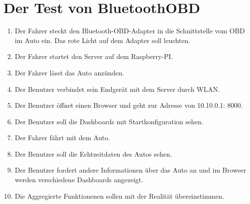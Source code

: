 \documentclass[qualitaetssicherung.tex]{subfiles}
\begin{document}
\section{Der Test von BluetoothOBD}
\begin{enumerate}
  \item Der Fahrer steckt den Bluetooth-OBD-Adapter in die Schnittstelle vom OBD
  im Auto ein. Das rote Licht auf dem Adapter soll leuchten.
  \item Der Fahrer startet den Server auf dem Raspberry-PI.
  \item Der Fahrer lässt das Auto anzünden.
  \item Der Benutzer verbindet sein Endgerät mit dem Server durch WLAN.
  \item Der Benutzer öffnet einen Browser und geht zur Adresse von 10.10.0.1:
  8000.
  \item Der Benutzer soll die Dashboards mit Startkonfiguration sehen.
  \item Der Fahrer fährt mit dem Auto.
  \item Der Benutzer soll die Echtzeitdaten des Autos sehen.
  \item Der Benutzer fordert andere Informationen über das Auto an und im
  Browser werden verschiedene Dashboards angezeigt.
  \item Die Aggregierte Funktionenen sollen mit der Realität übereinstimmen.
\end{enumerate}
\end{document}
